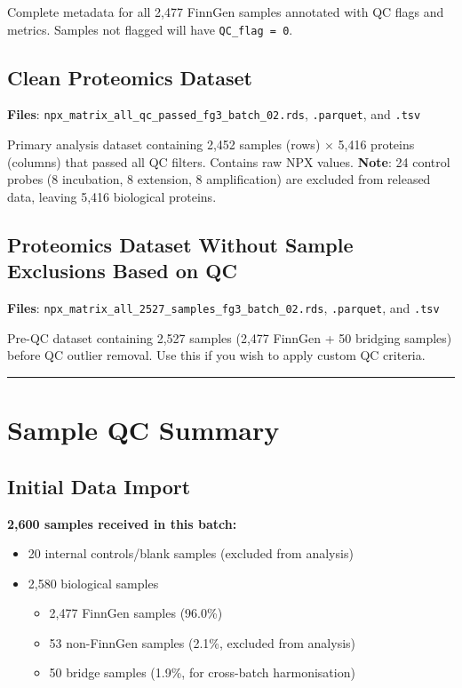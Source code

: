 \documentclass[11pt,a4paper]{article}
\begin{document}
Complete metadata for all 2,477 FinnGen samples annotated with QC flags and metrics. Samples not flagged will have \texttt{QC\_flag = 0}.

\subsection{Clean Proteomics Dataset}

\textbf{Files}: \texttt{npx\_matrix\_all\_qc\_passed\_fg3\_batch\_02.rds}, \texttt{.parquet}, and \texttt{.tsv}

Primary analysis dataset containing 2,452 samples (rows) $\times$ 5,416 proteins (columns) that passed all QC filters. Contains raw NPX values. \textbf{Note}: 24 control probes (8 incubation, 8 extension, 8 amplification) are excluded from released data, leaving 5,416 biological proteins.

\subsection{Proteomics Dataset Without Sample Exclusions Based on QC}

\textbf{Files}: \texttt{npx\_matrix\_all\_2527\_samples\_fg3\_batch\_02.rds}, \texttt{.parquet}, and \texttt{.tsv}

Pre-QC dataset containing 2,527 samples (2,477 FinnGen + 50 bridging samples) before QC outlier removal. Use this if you wish to apply custom QC criteria.

\vspace{0.5cm}
\noindent\rule{\linewidth}{0.5pt}
\vspace{0.5cm}

\section{Sample QC Summary}

\subsection{Initial Data Import}
\textbf{2,600 samples received in this batch:}
\begin{itemize}
\item 20 internal controls/blank samples (excluded from analysis)
\item 2,580 biological samples
  \begin{itemize}
    \item 2,477 FinnGen samples (96.0\%)
    \item 53 non-FinnGen samples (2.1\%, excluded from analysis)
    \item 50 bridge samples (1.9\%, for cross-batch harmonisation)
  \end{itemize}
\end{itemize}
\end{document}
